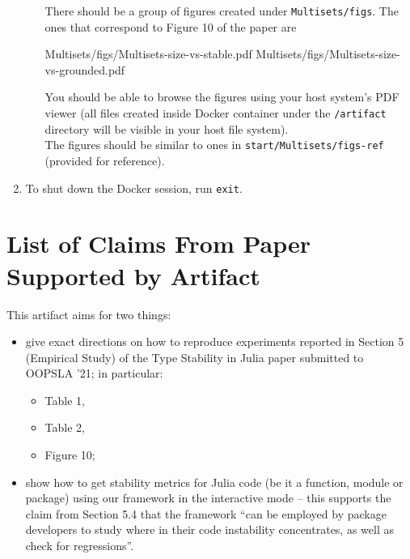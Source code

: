 \documentclass[
]{article}
\providecommand{\tightlist}{%
  \setlength{\itemsep}{0pt}\setlength{\parskip}{0pt}}
\begin{document}
\begin{enumerate}
\begin{enumerate}
    There should be a group of figures created under
    \texttt{Multisets/figs}. The ones that correspond to Figure 10 of
    the paper are

\begin{verbnobox}[\small]
Multisets/figs/Multisets-size-vs-stable.pdf
Multisets/figs/Multisets-size-vs-grounded.pdf
\end{verbnobox}

    You should be able to browse the figures using your host system's
    PDF viewer (all files created inside Docker container under the
    \texttt{/artifact} directory will be visible in your host file
    system).\\
    The figures should be similar to ones in
    \texttt{start/Multisets/figs-ref} (provided for reference).
  \end{enumerate}
\item
  To shut down the Docker session, run \texttt{exit}.
\end{enumerate}

\hypertarget{list-of-claims-from-paper-supported-by-artifact}{%
\section{List of Claims From Paper Supported by
Artifact}\label{list-of-claims-from-paper-supported-by-artifact}}

This artifact aims for two things:

\begin{itemize}
\item
  give exact directions on how to reproduce experiments reported in
  Section 5 (Empirical Study) of the Type Stability in Julia paper
  submitted to OOPSLA '21; in particular:

  \begin{itemize}
  \tightlist
  \item
    Table 1,
  \item
    Table 2,
  \item
    Figure 10;
  \end{itemize}
\item
  show how to get stability metrics for Julia code (be it a function,
  module or package) using our framework in the interactive mode -- this
  supports the claim from Section 5.4 that the framework ``can be
  employed by package developers to study where in their code
  instability concentrates, as well as check for regressions''.
\end{itemize}
\end{document}
